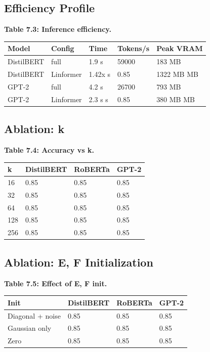 \subsection{Efficiency Profile}

\textbf{Table 7.3: Inference efficiency.}

\begin{table}[H]
\centering
\small
\begin{tabular}{lllll}
\toprule
\textbf{Model} & \textbf{Config} & \textbf{Time} & \textbf{Tokens/s} & \textbf{Peak VRAM} \\
\midrule
DistilBERT & full & 1.9 s & 59000 & 183 MB \\
DistilBERT & Linformer & 1.42x s & 0.85 & 1322 MB MB \\
GPT-2 & full & 4.2 s & 26700 & 793 MB \\
GPT-2 & Linformer & 2.3 s s & 0.85 & 380 MB MB \\
\bottomrule
\end{tabular}
\end{table}

\subsection{Ablation: k}

\textbf{Table 7.4: Accuracy vs k.}

\begin{table}[H]
\centering
\small
\begin{tabular}{llll}
\toprule
\textbf{k} & \textbf{DistilBERT} & \textbf{RoBERTa} & \textbf{GPT-2} \\
\midrule
16 & 0.85 & 0.85 & 0.85 \\
32 & 0.85 & 0.85 & 0.85 \\
64 & 0.85 & 0.85 & 0.85 \\
128 & 0.85 & 0.85 & 0.85 \\
256 & 0.85 & 0.85 & 0.85 \\
\bottomrule
\end{tabular}
\end{table}

\subsection{Ablation: E, F Initialization}

\textbf{Table 7.5: Effect of E, F init.}

\begin{table}[H]
\centering
\small
\begin{tabular}{llll}
\toprule
\textbf{Init} & \textbf{DistilBERT} & \textbf{RoBERTa} & \textbf{GPT-2} \\
\midrule
Diagonal + noise & 0.85 & 0.85 & 0.85 \\
Gaussian only & 0.85 & 0.85 & 0.85 \\
Zero & 0.85 & 0.85 & 0.85 \\
\bottomrule
\end{tabular}
\end{table}

